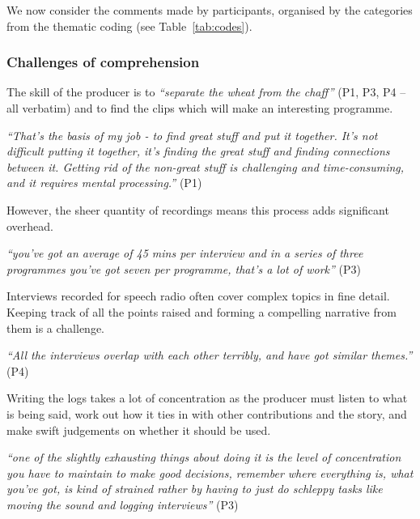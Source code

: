 
We now consider the comments made by participants, organised by the categories from the thematic coding (see Table~\ref{tab:codes}).

\subsubsection{Challenges of comprehension}

The skill of the producer is to \textit{``separate the wheat from the chaff''} (P1, P3, P4 -- all verbatim) and to find
the clips which will make an interesting programme.

\textit{``That's the basis of my job - to find great stuff and put it together.
  It's not difficult putting it together, it's finding the great stuff and finding connections between it. Getting rid
  of the non-great stuff is
  challenging and time-consuming, and it requires mental processing.''} (P1)

However, the sheer quantity of recordings means this process adds significant overhead.

\textit{``you've got an average of 45 mins per interview and in a series of
  three programmes you've got seven per programme, that's a lot of work''} (P3)

Interviews recorded for speech radio often cover complex topics in fine
detail. Keeping track of all the points raised and forming a compelling
narrative from them is a challenge.

\textit{``All the interviews overlap with each other terribly, and have got
  similar themes.''} (P4)

Writing the logs takes a lot of concentration as the producer must listen to
what is being said, work out how it ties in with other contributions and the
story, and make swift judgements on whether it should be used.

\textit{``one of the slightly exhausting things about doing it is the level of
  concentration you have to maintain to make good decisions, remember where
  everything is, what you've got, is kind of strained rather by having to just
  do schleppy tasks like moving the sound and logging interviews''} (P3)

